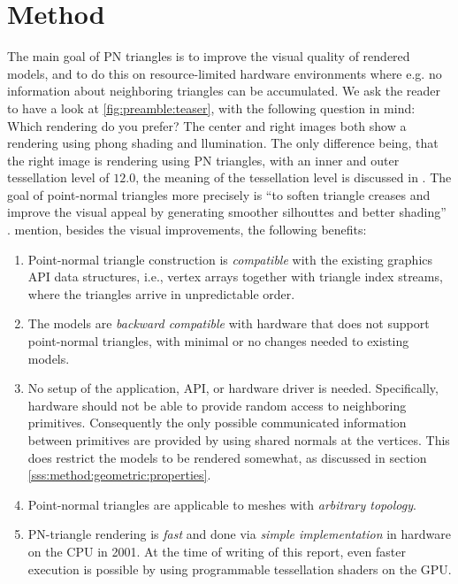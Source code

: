 
\section{Method}
\label{s:method}
The main goal of PN triangles is to improve the visual quality of rendered models, and to do this on resource-limited hardware environments where e.g. no information about neighboring triangles can be accumulated. We ask the reader to have a look at \cref{fig:preamble:teaser}, with the following question in mind: Which rendering do you prefer? The center and right images both show a rendering using phong shading and llumination. The only difference being, that the right image is rendering using PN triangles, with an inner and outer tessellation level of $12.0$, the meaning of the tessellation level is discussed in . The goal of point-normal triangles more precisely is ``to soften triangle creases and improve the visual appeal by generating smoother silhouttes and better shading'' \cite{vlachos2001curved}. \citeauthor{vlachos2001curved} mention, besides the visual improvements, the following benefits:

\begin{enumerate}[label=(\roman*)]
 	\item 
 		Point-normal triangle construction is \textit{compatible} with the existing graphics API data structures, i.e., vertex arrays together with triangle index streams, where the triangles arrive in unpredictable order.
 	\item 
 		The models are \textit{backward compatible} with hardware that does not support point-normal triangles, with minimal or no changes needed to existing models.
 	\item 
 		No setup of the application, API, or hardware driver is needed. Specifically, hardware should not be able to provide random access to neighboring primitives. Consequently the only possible communicated information between primitives are provided by using shared normals at the vertices. This does restrict the models to be rendered somewhat, as discussed in section \ref{sss:method:geometric:properties}.
 	\item 
 		Point-normal triangles are applicable to meshes with \textit{arbitrary topology}.
 	\item 
 		PN-triangle rendering is \textit{fast} and done via \textit{simple implementation} in hardware on the CPU in 2001. At the time of writing of this report, even faster execution is possible by using programmable tessellation shaders on the GPU.
 \end{enumerate} 

